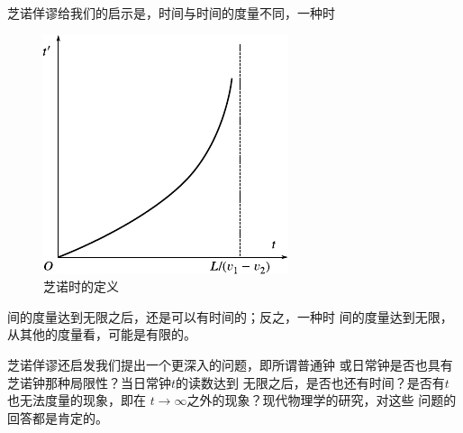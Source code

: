 芝诺佯谬给我们的启示是，时间与时间的度量不同，一种时

\begin{figure}
  \includegraphics{figure/fig01.03}
  \caption{芝诺时的定义}\label{fig:01.03}
\end{figure}
\noindent 间的度量达到无限之后，还是可以有时间的；反之，一种时
间的度量达到无限，从其他的度量看，可能是有限的。

芝诺佯谬还启发我们提出一个更深入的问题，即所谓普通钟
或日常钟是否也具有芝诺钟那种局限性？当日常钟$t$的读数达到
无限之后，是否也还有时间？是否有$t$也无法度量的现象，即在
$t\rightarrow\infty$之外的现象？现代物理学的研究，对这些
问题的回答都是肯定的。

